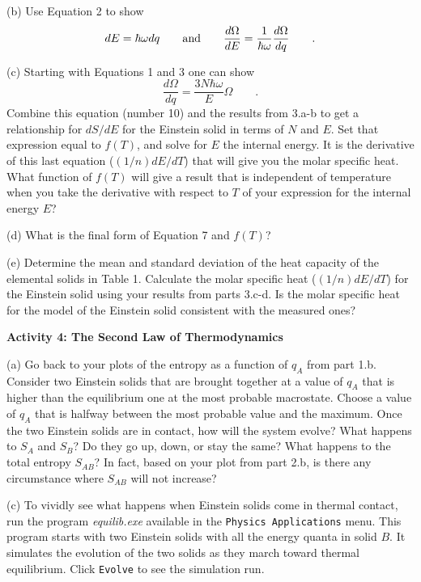 (b) Use Equation 2 to show 
\begin{equation}
dE = \hbar \omega dq \qquad {\rm and} \qquad  
    \frac{d\Omega}{dE}=\frac{1}{\hbar\omega} \frac{d\Omega}{dq}
\qquad .
\end{equation}
\vspace{15mm}

\newpage

(c) Starting with Equations 1 and 3 one can show
\begin{equation}
\frac{d\Omega}{dq} = \frac{3N\hbar \omega}{E} \Omega
\qquad .
\end{equation}
Combine this equation (number 10) and the  results from 3.a-b to 
get a relationship for $dS/dE$ for the Einstein solid in terms
of $N$ and $E$.
Set that expression equal to $f(T)$,
and solve for $E$ the internal energy.
It is the derivative of this last equation ($(1/n)dE/dT$) that will give you the molar specific heat.
What function of $f(T)$ will give a result that is independent of temperature when you
take the derivative with respect to $T$ of your expression for the internal energy $E$?
\vspace{45mm}

(d)  What is the final form of Equation 7 and $f(T)$?
\vspace{15mm}

(e) Determine the mean and standard deviation of the heat capacity of the elemental solids in
Table 1.
Calculate the molar specific heat ($(1/n)dE/dT$) for the Einstein solid using your results from
parts 3.c-d.
Is the molar specific heat for the model of the Einstein solid consistent with the measured ones?
\vspace{45mm}


\textbf{Activity 4: The Second Law of Thermodynamics}

(a) Go back to your plots of the entropy as a function of $q_A$ from part 1.b. 
Consider two Einstein solids that are brought together at a value of $q_A$ that is higher
than the equilibrium one at the most probable macrostate.
Choose a value of $q_A$ that is halfway between the most probable value and the maximum.
Once the two Einstein solids are in contact, how will the system evolve?
What happens to $S_A$ and $S_B$? Do they go up, down, or stay the same?
What happens to the total entropy $S_{AB}$?
In fact, based on your plot from part 2.b, is there any circumstance where
$S_{AB}$ will not increase?
\vspace{30mm}

(c) To  vividly see what happens when Einstein solids come in thermal contact,
run the program {\it equilib.exe} available in the {\tt Physics Applications} menu.
This program starts with two Einstein solids with all the energy quanta in solid $B$.
It simulates the evolution of the two solids as they march toward
thermal equilibrium.
Click {\tt Evolve} to see the simulation run.

